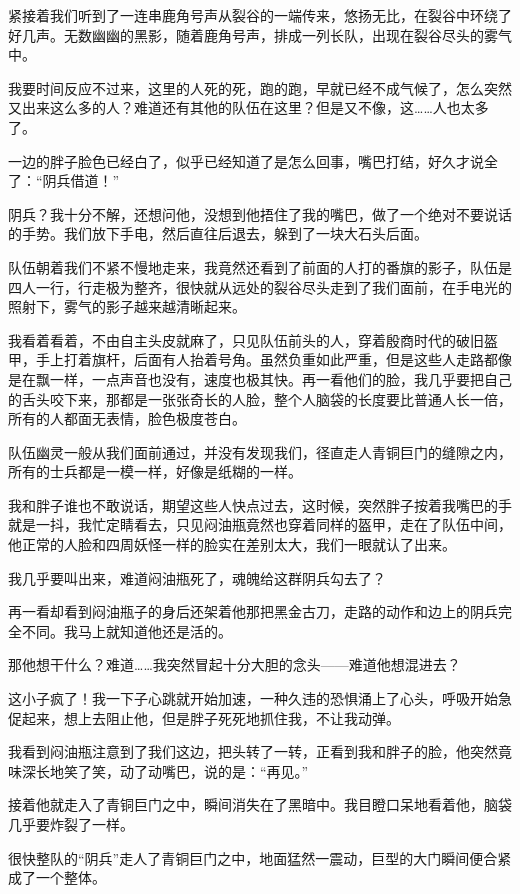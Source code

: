 紧接着我们听到了一连串鹿角号声从裂谷的一端传来，悠扬无比，在裂谷中环绕了好几声。无数幽幽的黑影，随着鹿角号声，排成一列长队，出现在裂谷尽头的雾气中。

我要时间反应不过来，这里的人死的死，跑的跑，早就已经不成气候了，怎么突然又出来这么多的人？难道还有其他的队伍在这里？但是又不像，这……人也太多了。

一边的胖子脸色已经白了，似乎已经知道了是怎么回事，嘴巴打结，好久才说全了：“阴兵借道！”

阴兵？我十分不解，还想问他，没想到他捂住了我的嘴巴，做了一个绝对不要说话的手势。我们放下手电，然后直往后退去，躲到了一块大石头后面。

队伍朝着我们不紧不慢地走来，我竟然还看到了前面的人打的番旗的影子，队伍是四人一行，行走极为整齐，很快就从远处的裂谷尽头走到了我们面前，在手电光的照射下，雾气的影子越来越清晰起来。

我看着看着，不由自主头皮就麻了，只见队伍前头的人，穿着殷商时代的破旧盔甲，手上打着旗杆，后面有人抬着号角。虽然负重如此严重，但是这些人走路都像是在飘一样，一点声音也没有，速度也极其快。再一看他们的脸，我几乎要把自己的舌头咬下来，那都是一张张奇长的人脸，整个人脑袋的长度要比普通人长一倍，所有的人都面无表情，脸色极度苍白。

队伍幽灵一般从我们面前通过，并没有发现我们，径直走人青铜巨门的缝隙之内，所有的士兵都是一模一样，好像是纸糊的一样。

我和胖子谁也不敢说话，期望这些人快点过去，这时候，突然胖子按着我嘴巴的手就是一抖，我忙定睛看去，只见闷油瓶竟然也穿着同样的盔甲，走在了队伍中间，他正常的人脸和四周妖怪一样的脸实在差别太大，我们一眼就认了出来。

我几乎要叫出来，难道闷油瓶死了，魂魄给这群阴兵勾去了？

再一看却看到闷油瓶子的身后还架着他那把黑金古刀，走路的动作和边上的阴兵完全不同。我马上就知道他还是活的。

那他想干什么？难道……我突然冒起十分大胆的念头——难道他想混进去？

这小子疯了！我一下子心跳就开始加速，一种久违的恐惧涌上了心头，呼吸开始急促起来，想上去阻止他，但是胖子死死地抓住我，不让我动弹。

我看到闷油瓶注意到了我们这边，把头转了一转，正看到我和胖子的脸，他突然竟味深长地笑了笑，动了动嘴巴，说的是：“再见。”

接着他就走入了青铜巨门之中，瞬间消失在了黑暗中。我目瞪口呆地看着他，脑袋几乎要炸裂了一样。

很快整队的“阴兵”走人了青铜巨门之中，地面猛然一震动，巨型的大门瞬间便合紧成了一个整体。

